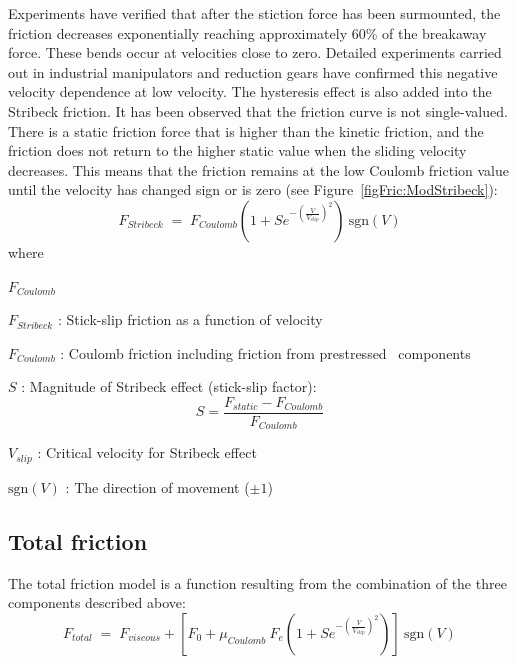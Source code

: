 Experiments have verified that after the stiction force has been surmounted,
the friction decreases exponentially reaching approximately 60\% of the
breakaway force. These bends occur at velocities close to zero.
Detailed experiments carried out in industrial manipulators and reduction gears
have confirmed this negative velocity dependence at low velocity.
The hysteresis effect is also added into the Stribeck friction.
It has been observed that the friction curve is not single-valued.
There is a static friction force that is higher than the kinetic friction,
and the friction does not return to the higher static value when the sliding
velocity decreases.
This means that the friction remains at the low Coulomb friction value until
the velocity has changed sign or is zero (see Figure~\ref{figFric:ModStribeck}):
%
\begin{equation}
F_{\textit{Stribeck}} \;=\; F_{\textit{Coulomb}}
(1 + S e^{-(\frac{V}{V_{\textit{slip}}})^2})\: \text{sgn}(V)
\end{equation}
%
where
%
\begin{namelist}{$F_{\textit{Coulomb}}$}
\item[$F_{\textit{Stribeck}}$] : Stick-slip friction as a function of velocity
\item[$F_{\textit{Coulomb}}$]  : Coulomb friction including friction from
                                 prestressed \mbox{\hskip4pt}~components
\item[$S$] : Magnitude of Stribeck effect (stick-slip factor):
\[ S = \frac{F_{\textit{static}}-F_{\textit{Coulomb}}}{F_{\textit{Coulomb}}} \]
\item[$V_{\textit{slip}}$]     : Critical velocity for Stribeck effect
\item[$\text{sgn}(V)$]         : The direction of movement ($\pm 1$)
\end{namelist}


\subsection{Total friction}

The total friction model is a function resulting from the combination of the
three components described above:
%
\begin{equation}
F_{\textit{total}} \;=\; F_{\textit{viscous}} +
\left[ F_0 + \mu_{\textit{Coulomb}} \: F_e
\left( 1 + S e^{-(\frac{V}{V_{\textit{slip}}})^2}
\right)\right]\: \text{sgn}(V)
\end{equation}


